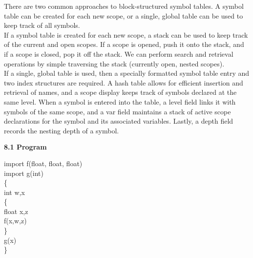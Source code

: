 \documentclass[letterpaper, 10pt,DIV=13]{scrartcl}
\numberwithin{equation}{section} %
\numberwithin{figure}{section} %
\numberwithin{table}{section} %
\begin{document}
There are two common approaches to block-structured symbol tables. A symbol table can be created for each new scope, or a single, global table can be used to keep track of all symbols. \\

If a symbol table is created for each new scope, a stack can be used to keep track of the current and open scopes. If a scope is opened, push it onto the stack, and if a scope is closed, pop it off the stack. We can perform search and retrieval operations by simple traversing the stack (currently open, nested scopes). \\

If a single, global table is used, then a specially formatted symbol table entry and two index structures are required. A hash table allows for efficient insertion and retrieval of names, and a scope display keeps track of symbols declared at the same level. When a symbol is entered into the table, a level field links it with symbols of the same scope, and a var field maintains a stack of active scope declarations for the symbol and its associated variables. Lastly, a depth field records the nesting depth of a symbol.

\textbf{8.1 Program} \\
\begin{algorithm}[H]
	\SetAlgoLined
	import f(float, float, float) \\
	import g(int) \\
	\{ \\
		\Indp
		int w,x \\
		\{ \\
			\Indp
			float x,z \\
			f(x,w,z) \\
			\Indm
		\} \\
		g(x) \\
		\Indm
	\} \\
\end{algorithm}


\pagebreak

%
% 
\end{document}
